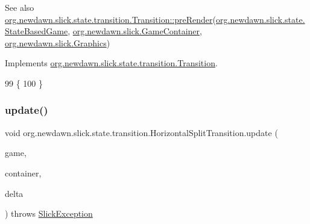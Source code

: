 \begin{DoxySeeAlso}{See also}
\mbox{\hyperlink{interfaceorg_1_1newdawn_1_1slick_1_1state_1_1transition_1_1_transition_ab8b0668c059830d938575d1a0b08bd93}{org.\+newdawn.\+slick.\+state.\+transition.\+Transition\+::pre\+Render}}(\mbox{\hyperlink{classorg_1_1newdawn_1_1slick_1_1state_1_1_state_based_game}{org.\+newdawn.\+slick.\+state.\+State\+Based\+Game}}, \mbox{\hyperlink{classorg_1_1newdawn_1_1slick_1_1_game_container}{org.\+newdawn.\+slick.\+Game\+Container}}, \mbox{\hyperlink{classorg_1_1newdawn_1_1slick_1_1_graphics}{org.\+newdawn.\+slick.\+Graphics}}) 
\end{DoxySeeAlso}


Implements \mbox{\hyperlink{interfaceorg_1_1newdawn_1_1slick_1_1state_1_1transition_1_1_transition_ab8b0668c059830d938575d1a0b08bd93}{org.\+newdawn.\+slick.\+state.\+transition.\+Transition}}.


\begin{DoxyCode}
99                                               \{
100     \}
\end{DoxyCode}
\mbox{\label{classorg_1_1newdawn_1_1slick_1_1state_1_1transition_1_1_horizontal_split_transition_acfce01e5c44c98055d96d16c7608e313}} 
\subsubsection{\texorpdfstring{update()}{update()}}
{\footnotesize\ttfamily void org.\+newdawn.\+slick.\+state.\+transition.\+Horizontal\+Split\+Transition.\+update (\begin{DoxyParamCaption}\item[{\mbox{\hyperlink{classorg_1_1newdawn_1_1slick_1_1state_1_1_state_based_game}{State\+Based\+Game}}}]{game,  }\item[{\mbox{\hyperlink{classorg_1_1newdawn_1_1slick_1_1_game_container}{Game\+Container}}}]{container,  }\item[{int}]{delta }\end{DoxyParamCaption}) throws \mbox{\hyperlink{classorg_1_1newdawn_1_1slick_1_1_slick_exception}{Slick\+Exception}}\hspace{0.3cm}{\ttfamily [inline]}}

